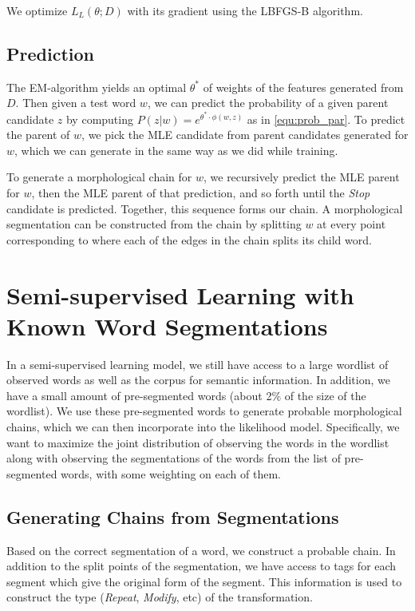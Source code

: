 \documentclass[11pt,twocolumn]{article}
\begin{document}
We optimize $L_L(\theta; D)$ with its gradient using the LBFGS-B algorithm.

\subsection{Prediction}
The EM-algorithm yields an optimal $\theta^*$ of weights of the features generated from $D$. Then given a test word $w$, we can predict the probability of a given parent candidate $z$ by computing $P(z|w)=e^{\theta^*\cdot\phi(w,z)}$ as in \autoref{equ:prob_par}. To predict the parent of $w$, we pick the MLE candidate from parent candidates generated for $w$, which we can generate in the same way as we did while training.

To generate a morphological chain for $w$, we recursively predict the MLE parent for $w$, then the MLE parent of that prediction, and so forth until the \emph{Stop} candidate is predicted. Together, this sequence forms our chain. A morphological segmentation can be constructed from the chain by splitting $w$ at every point corresponding to where each of the edges in the chain splits its child word.

\section{Semi-supervised Learning with Known Word Segmentations}
In a semi-supervised learning model, we still have access to a large wordlist of observed words as well as the corpus for semantic information. In addition, we have a small amount of pre-segmented words (about 2\% of the size of the wordlist). We use these pre-segmented words to generate probable morphological chains, which we can then incorporate into the likelihood model. Specifically, we want to maximize the joint distribution of observing the words in the wordlist along with observing the segmentations of the words from the list of pre-segmented words, with some weighting on each of them.

\subsection{Generating Chains from Segmentations}
Based on the correct segmentation of a word, we construct a probable chain. In addition to the split points of the segmentation, we have access to tags for each segment which give the original form of the segment. This information is used to construct the type (\emph{Repeat}, \emph{Modify}, etc) of the transformation.
\end{document}
